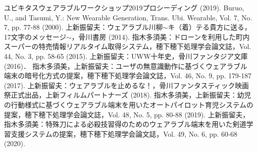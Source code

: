 \documentclass[a4j]{jarticle}%
\begin{document}
\begin{thebibliography}{10}

   ユビキタスウェアラブルワークショップ2019プロシーディング (2019).
   Buruo, U., and Tasumi, Y.: New Wearable Generation, Trans. Ubi. Wearable, Vol. 7, No. 7, pp. 77-88 (2000).
   上新振留夫：ウェアラブル川柳$\sim$キ（着）テる貴方に送る，17文字のメッセージ$\sim$，骨川書房 (2014).
   指木多須美：ドローンを利用した町内スーパーの特売情報リアルタイム取得システム，穂下穂下処理学会論文誌，Vol. 44, No. 3, pp. 58-65 (2015).
   上新振留夫：UWW十年史，骨川ファンタジア文庫 (2016)．
   指木多須美，上新振留夫：ユーザの無意識動作に基づくウェアラブル端末の暗号化方式の提案，穂下穂下処理学会論文誌，Vol. 46, No. 9, pp. 179-187 (2017).
   上新振留夫：ウェアラブルを止めるな！，骨川ファンタスティック映画祭正式出品，上新フィルムパートナーズ (2018).
   指木多須美，上新振留夫：幼児の行動様式に基づくウェアラブル端末を用いたオートパイロット育児システムの提案，穂下穂下処理学会論文誌，Vol. 48, No. 5, pp. 80-88 (2019).
   上新振留夫，指木多須美：特殊刀による必殺技習得のためのウェアラブル端末を用いた剣道学習支援システムの提案，穂下穂下処理学会論文誌，Vol. 49, No. 6, pp. 60-68 (2020).
\end{thebibliography}
\end{document}
